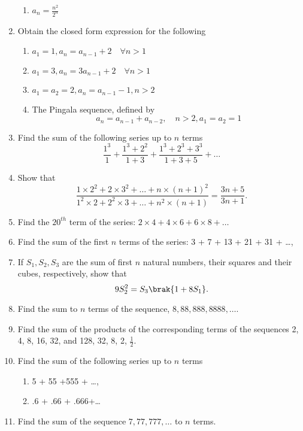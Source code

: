 \begin{enumerate}[label=\thesubsection.\arabic*,ref=\thesubsection.\theenumi]
\begin{enumerate}
\item $a_n = \frac{n^2}{2^n}$
\end{enumerate}
\item Obtain the closed form expression for the following
\begin{enumerate}
\item $a_1 = 1, a_n = a_{n-1}+2 \quad \forall n > 1$
\item $a_1 = 3, a_n = 3a_{n-1}+2 \quad \forall n > 1$
\item $a_1 = a_2 = 2, a_n = a_{n-1}-1, n > 2$ 
\item The Pingala sequence, defined by $$a_n = a_{n-1}+a_{n-2}, \quad n>2,  a_1 = a_2=1$$ 
\end{enumerate}
\item Find the sum of the following series up to $n$ terms
$$\frac{1^3}{1}+\frac{1^3+2^2}{1+3}+\frac{1^3+2^3+3^3}{1+3+5}+\dots$$
\item Show that $$\frac{1 \times 2^2+ 2 \times 3^2+\dots+n \times (n+1)^2}{1^2 \times 2 + 2^2 \times 3 +\dots+n^2 \times (n+1)} = \frac{3n+5}{3n+1}.$$
\item Find the $20^{th}$ term of the series: $2 \times 4 + 4 \times 6 + 6 \times 8 + \dots  $ 
\item Find the sum of the first $n$ terms of the series: 3 + 7 + 13 + 21 + 31 + \dots, 
\item If $S_1, S_2, S_3$ are the sum of first $n$ natural numbers, their squares and their cubes, respectively, show that $$9 S_2^2 = S_3 \brak{1 + 8S_1}.$$
\item Find the sum to $n$ terms of the sequence, $8, 88, 888, 8888, \dots$. 
\item Find the sum of the products of the corresponding terms of the sequences 2, 4, 8, 16, 32, and 128, 32, 8, 2, $\frac{1}{2}$.
\item Find the sum of the following series up to $n$ terms
\begin{enumerate}
\item 5 + 55 +555 + \dots, 
\item .6 + .66 + .666+\dots 
\end{enumerate}
\item Find the sum of the sequence $7, 77, 777, \dots$ to $n$ terms.
\end{enumerate}
